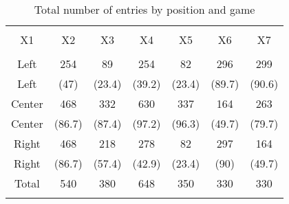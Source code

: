
\begin{table}[!htbp] \centering 
  \caption{Total number of entries by position and game} 
  \label{tab:rawentry} 
\begin{tabular}{@{\extracolsep{5pt}} ccccccc} 
\\[-1.8ex]\hline 
\hline \\[-1.8ex] 
X1 & X2 & X3 & X4 & X5 & X6 & X7 \\ 
\hline \\[-1.8ex] 
Left & 254 &  89 & 254 &  82 & 296 & 299 \\ 
Left & (47) & (23.4) & (39.2) & (23.4) & (89.7) & (90.6) \\ 
Center & 468 & 332 & 630 & 337 & 164 & 263 \\ 
Center & (86.7) & (87.4) & (97.2) & (96.3) & (49.7) & (79.7) \\ 
Right & 468 & 218 & 278 &  82 & 297 & 164 \\ 
Right & (86.7) & (57.4) & (42.9) & (23.4) & (90) & (49.7) \\ 
Total & 540 & 380 & 648 & 350 & 330 & 330 \\ 
\hline \\[-1.8ex] 
\end{tabular} 
\end{table} 
